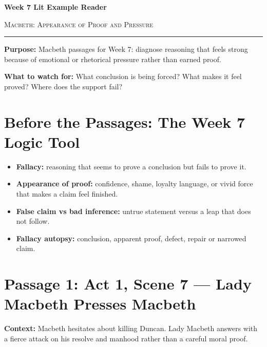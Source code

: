 \documentclass[12pt]{article}
\begin{document}
\begin{center}
{\LARGE\bfseries Week 7 Lit Example Reader}\par\vspace{0.02em}
{\large\scshape Macbeth: Appearance of Proof and Pressure}\par\vspace{0.08em}
\rule{0.78\textwidth}{0.5pt}
\end{center}

\textbf{Purpose:} Macbeth passages for Week 7: diagnose reasoning that feels strong because of emotional or rhetorical pressure rather than earned proof.

\textbf{What to watch for:} What conclusion is being forced? What makes it feel proved? Where does the support fail?

\section*{Before the Passages: The Week 7 Logic Tool}

\begin{itemize}[leftmargin=1.3em,itemsep=0.08em,topsep=0.1em,parsep=0.04em]
\item \textbf{Fallacy:} reasoning that seems to prove a conclusion but fails to prove it.
\item \textbf{Appearance of proof:} confidence, shame, loyalty language, or vivid force that makes a claim feel finished.
\item \textbf{False claim vs bad inference:} untrue statement versus a leap that does not follow.
\item \textbf{Fallacy autopsy:} conclusion, apparent proof, defect, repair or narrowed claim.
\end{itemize}

\section*{Passage 1: Act 1, Scene 7 --- Lady Macbeth Presses Macbeth}

\textbf{Context:} Macbeth hesitates about killing Duncan. Lady Macbeth answers with a fierce attack on his resolve and manhood rather than a careful moral proof.
\end{document}
